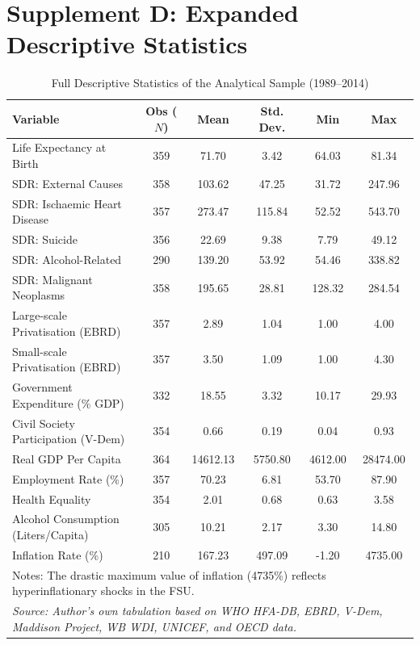 \documentclass[en,magisterska]{pracamgr}
\begin{document}
\newpage
\section*{Supplement D: Expanded Descriptive Statistics}

\begin{table}[H]
\centering
\caption{Full Descriptive Statistics of the Analytical Sample (1989--2014)}
\label{tab:desc_stat}
\footnotesize
\begin{tabular}{l c c c c c}
\toprule
\textbf{Variable} & \textbf{Obs ($N$)} & \textbf{Mean} & \textbf{Std. Dev.} & \textbf{Min} & \textbf{Max} \\
\midrule
Life Expectancy at Birth & 359 & 71.70 & 3.42 & 64.03 & 81.34 \\
SDR: External Causes & 358 & 103.62 & 47.25 & 31.72 & 247.96 \\
SDR: Ischaemic Heart Disease & 357 & 273.47 & 115.84 & 52.52 & 543.70 \\
SDR: Suicide & 356 & 22.69 & 9.38 & 7.79 & 49.12 \\
SDR: Alcohol-Related & 290 & 139.20 & 53.92 & 54.46 & 338.82 \\
SDR: Malignant Neoplasms & 358 & 195.65 & 28.81 & 128.32 & 284.54 \\
Large-scale Privatisation (EBRD) & 357 & 2.89 & 1.04 & 1.00 & 4.00 \\
Small-scale Privatisation (EBRD) & 357 & 3.50 & 1.09 & 1.00 & 4.30 \\
Government Expenditure (\% GDP) & 332 & 18.55 & 3.32 & 10.17 & 29.93 \\
Civil Society Participation (V-Dem) & 354 & 0.66 & 0.19 & 0.04 & 0.93 \\
Real GDP Per Capita & 364 & 14612.13 & 5750.80 & 4612.00 & 28474.00 \\
Employment Rate (\%) & 357 & 70.23 & 6.81 & 53.70 & 87.90 \\
Health Equality & 354 & 2.01 & 0.68 & 0.63 & 3.58 \\
Alcohol Consumption (Liters/Capita) & 305 & 10.21 & 2.17 & 3.30 & 14.80 \\
Inflation Rate (\%) & 210 & 167.23 & 497.09 & -1.20 & 4735.00 \\
\bottomrule
\multicolumn{6}{l}{\scriptsize Notes: The drastic maximum value of inflation (4735\%) reflects hyperinflationary shocks in the FSU.} \\
\multicolumn{6}{l}{\scriptsize \textit{Source: Author's own tabulation based on WHO HFA-DB, EBRD, V-Dem, Maddison Project, WB WDI, UNICEF, and OECD data.}} \\
\end{tabular}
\end{table}
\end{document}
